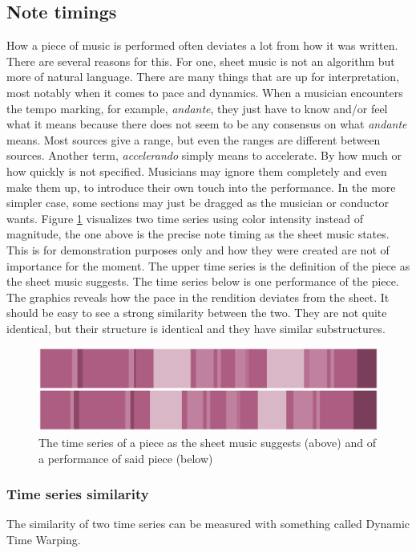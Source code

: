\subsection{Note timings}
How a piece of music is performed often deviates a lot from how it was written. There are several reasons for this. For one, sheet music is not an algorithm but more of natural language. There are many things that are up for interpretation, most notably when it comes to pace and dynamics. When a musician encounters the tempo marking, for example, \textit{andante}, they just have to know and/or feel what it means because there does not seem to be any consensus on what \textit{andante} means. Most sources give a range, but even the ranges are different between sources. Another term, \textit{accelerando} simply means to accelerate. By how much or how quickly is not specified. Musicians may ignore them completely and even make them up, to introduce their own touch into the performance. In the more simpler case, some sections may just be dragged as the musician or conductor wants. Figure \ref{fig:performance-sheet} visualizes two time series using color intensity instead of magnitude, the one above is the precise note timing as the sheet music states. This is for demonstration purposes only and how they were created are not of importance for the moment. The upper time series is the definition of the piece as the sheet music suggests. The time series below is one performance of the piece. The graphics reveals how the pace in the rendition deviates from the sheet. It should be easy to see a strong similarity between the two. They are not quite identical, but their structure is identical and they have similar substructures. 

\begin{figure}[ht]
    \centering
    \includegraphics[width=\textwidth]{./images/performance-sheet.png}
    \caption{The time series of a piece as the sheet music suggests (above) and of a performance of said piece (below)\label{fig:performance-sheet}}
\end{figure}

\subsubsection{Time series similarity}
The similarity of two time series can be measured with something called Dynamic Time Warping. 


